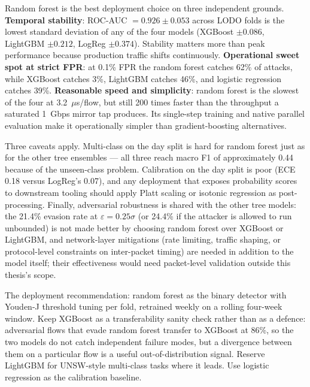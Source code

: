 
Random forest is the best deployment choice on three independent
grounds. \textbf{Temporal stability}: ROC-AUC $= 0.926 \pm 0.053$ across
LODO folds is the lowest standard deviation of any of the four models
(XGBoost $\pm 0.086$, LightGBM $\pm 0.212$, LogReg $\pm 0.374$).
Stability matters more than peak performance because production traffic
shifts continuously. \textbf{Operational sweet spot at strict FPR}: at
0.1\% FPR the random forest catches 62\% of attacks, while XGBoost
catches 3\%, LightGBM catches 46\%, and logistic regression catches
39\%. \textbf{Reasonable speed and simplicity}: random forest is the
slowest of the four at 3.2~$\mu$s/flow, but still 200 times faster than
the throughput a saturated 1~Gbps mirror tap produces. Its single-step
training and native parallel evaluation make it operationally simpler
than gradient-boosting alternatives.

Three caveats apply. Multi-class on the day split is hard for random
forest just as for the other tree ensembles --- all three reach macro F1
of approximately 0.44 because of the unseen-class problem. Calibration
on the day split is poor (ECE 0.18 versus LogReg's 0.07), and any
deployment that exposes probability scores to downstream tooling should
apply Platt scaling or isotonic regression as post-processing. Finally,
adversarial robustness is shared with the other tree models: the 21.4\%
evasion rate at $\varepsilon = 0.25\sigma$ (or 24.4\% if the attacker is
allowed to run unbounded) is not made better by choosing random forest
over XGBoost or LightGBM, and network-layer mitigations (rate limiting,
traffic shaping, or protocol-level constraints on inter-packet timing)
are needed in addition to the model itself; their effectiveness would
need packet-level validation outside this thesis's scope.

The deployment recommendation: random forest as the binary detector
with Youden-J threshold tuning per fold, retrained weekly on a rolling
four-week window. Keep XGBoost as a transferability sanity check rather
than as a defence: adversarial flows that evade random forest transfer
to XGBoost at 86\%, so the two models do not catch independent failure
modes, but a divergence between them on a particular flow is a useful
out-of-distribution signal. Reserve LightGBM for UNSW-style multi-class
tasks where it leads. Use logistic regression as the calibration
baseline.
